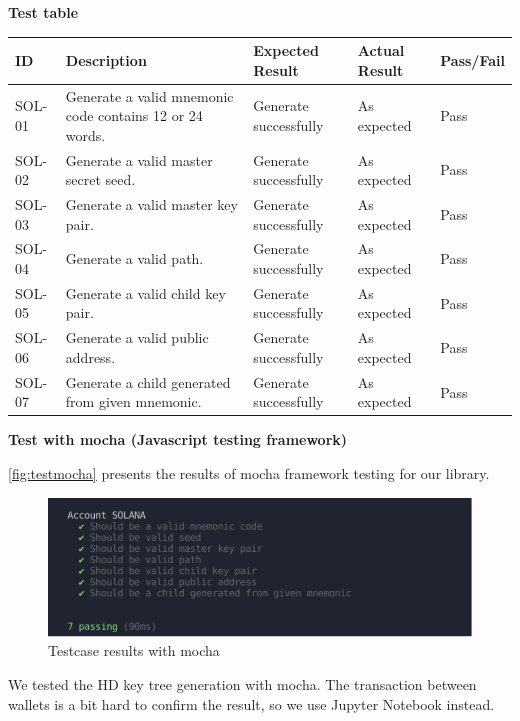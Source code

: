\bigskip
{\textbf{Test table}}
\bigskip

\begin{tabular}{ m{2cm} m{6cm}  m{2cm}  m{3cm}  m{2cm} }
    \toprule
    ID & Description & Expected Result & Actual Result & Pass/Fail                                            \\ 
    \midrule
    SOL-01 & Generate a valid mnemonic code contains 12 or 24 words. & Generate successfully & As expected & Pass \\ 
    SOL-02 & Generate a valid master secret seed.  &  Generate successfully & As expected & Pass  \\ 
    SOL-03 & Generate a valid master key pair. &   Generate successfully & As expected & Pass    \\ 
    SOL-04 & Generate a valid path. &  Generate successfully & As expected & Pass   \\ 
    SOL-05 & Generate a valid child key pair. &  Generate successfully & As expected & Pass   \\ 
    SOL-06 & Generate a valid public address.&  Generate successfully & As expected & Pass   \\ 
    SOL-07 & Generate a child generated from given mnemonic.&  Generate successfully & As expected & Pass   \\
    \bottomrule
\end{tabular}

\bigskip
{\textbf{Test with mocha (Javascript testing framework)}}

\bigskip
\autoref{fig:testmocha} presents the results of mocha framework testing for our library.
\bigskip

\begin{figure}[ht!]
    \centering
    \includegraphics[width=1\textwidth]{images/test_mocha.png}
    \caption[Testcase results with mocha]{Testcase results with mocha}
    \label{fig:testmocha}
\end{figure}

We tested the HD key tree generation with mocha. The transaction between wallets is a bit hard to confirm the result, so we use Jupyter Notebook instead.

